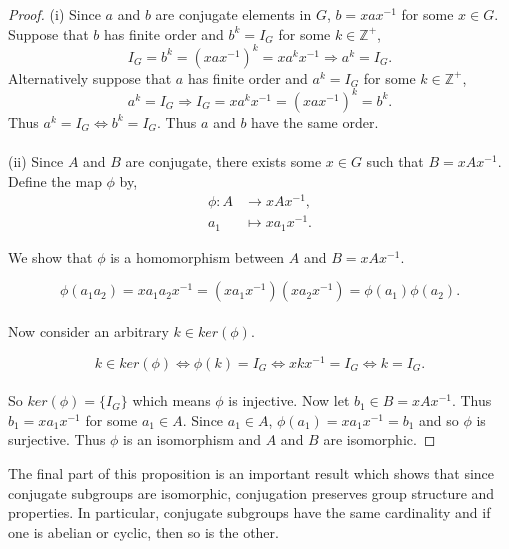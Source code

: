 \begin{proof}
(i) Since $a$ and $b$ are conjugate elements in $G$, $b = xax^{-1}$ for some $x \in G$. Suppose that $b$ has finite order and $b^k = I_G$ for some $k \in \mathbb{Z}^+$,
\begin{equation*} I_G = b^k = (xax^{-1})^k = xa^{k}x^{-1} \Rightarrow a^k = I_G.
\end{equation*}
Alternatively suppose that $a$ has finite order and $a^k = I_G$ for some $k \in \mathbb{Z}^+$,
\begin{equation*} a^k = I_G \Rightarrow I_G = xa^{k}x^{-1} = (xax^{-1})^k = b^k.
\end{equation*}
Thus $a^k = I_G \iff b^k = I_G$. Thus $a$ and $b$ have the same order. \\
\\
(ii) Since $A$ and $B$ are conjugate, there exists some $x \in G$ such that $B=xAx^{-1}$. Define the map $\phi$ by,
\begin{align*}
\phi:A &\longrightarrow xAx^{-1}, \\
a_1 &\longmapsto xa_1x^{-1} \tag{$\forall \; a_1 \in A$}. \end{align*}

We show that $\phi$ is a homomorphism between $A$ and $B=xAx^{-1}$.

\begin{equation*}
\phi(a_1a_2) = xa_1a_2x^{-1} = ( xa_1x^{-1})( xa_2x^{-1}) = \phi(a_1) \phi(a_2).
\end{equation*}
\\
Now consider an arbitrary $k \in ker(\phi)$.

\begin{equation*}
k \in ker(\phi) \iff \phi(k) = I_G \iff  xkx^{-1} = I_G \iff k = I_G.
\end{equation*}
\\
So $ker(\phi) = \{ I_G \}$ which means $\phi$ is injective. Now let $b_1 \in B = xAx^{-1}$. Thus $b_1 = xa_1x^{-1}$ for some $a_1 \in A$. Since $a_1 \in A$, $\phi(a_1) = xa_1x^{-1} = b_1$ and so $\phi$ is surjective. Thus $\phi$ is an isomorphism and $A$ and $B$ are isomorphic.

\end{proof}

The final part of this proposition is an important result which shows that since conjugate subgroups are isomorphic, conjugation preserves group structure and properties. In particular, conjugate subgroups have the same cardinality and if one is abelian or cyclic, then so is the other.

